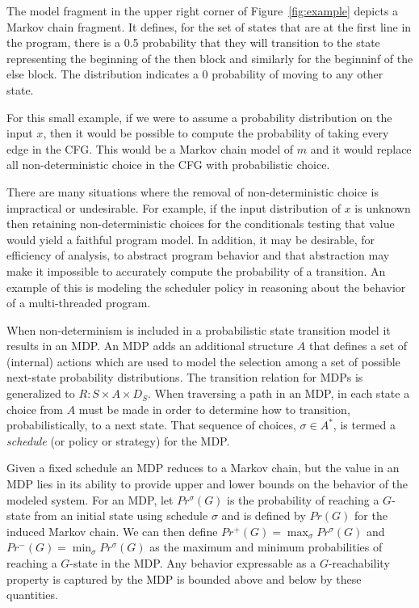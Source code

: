 The model fragment in the upper right corner of 
Figure~\ref{fig:example} depicts a Markov chain fragment.
It defines, for the set of states 
that are at the first line in the program, 
there is a 0.5 probability that they will transition to 
the state representing the beginning of the then block
and similarly for the beginninf of the else block.  The
distribution indicates a 0 probability of moving to any
other state.

For this small example, if we were to assume a probability
distribution on the input $x$, then it would be possible
to compute the probability of taking every edge in the CFG.   
This would be a Markov chain model of $m$ and it would replace
all non-deterministic choice in the CFG with probabilistic choice.

There are many situations where the removal of non-deterministic
choice is impractical or undesirable.  For example, if the input
distribution of $x$ is unknown then retaining non-deterministic
choices for the conditionals testing that value would yield a
faithful program model.  In addition, it may be desirable, for
efficiency of analysis, to abstract program behavior and that
abstraction may make it impossible to accurately compute the 
probability of a transition.  An example of this is modeling
the scheduler policy in reasoning about the behavior of a multi-threaded
program.

When non-determinism is included in a probabilistic state
transition model it results in an MDP.  
An MDP adds an additional structure $A$ that defines
a set of (internal) actions which are used to model the
selection among a set of possible next-state probability distributions.
The transition relation
for MDPs is generalized to $R : S \times A \times D_S$.
When traversing a path in an MDP, in each state a choice
from $A$ must be made in order to determine how to transition,
probabilistically, to a next state.   That sequence of choices, 
$\sigma \in A^*$, is termed a \textit{schedule} (or policy or 
strategy) for the MDP.

Given a fixed schedule an MDP reduces to a Markov chain, but
the value in an MDP lies in its ability to provide upper and
lower bounds on the behavior of the modeled system.
For an MDP, let $Pr^{\sigma}(G)$ is the probability of reaching
a $G$-state from an initial state using schedule $\sigma$ and
is defined by $Pr(G)$ for the induced Markov chain.
We can then define 
$Pr^+(G) = \max_{\sigma} Pr^{\sigma}(G)$
and
$Pr^-(G) = \min_{\sigma} Pr^{\sigma}(G)$
as the maximum and minimum probabilities of reaching a $G$-state
in the MDP.  Any behavior expressable as a $G$-reachability property is
captured by the MDP is bounded above and
below by these quantities.
